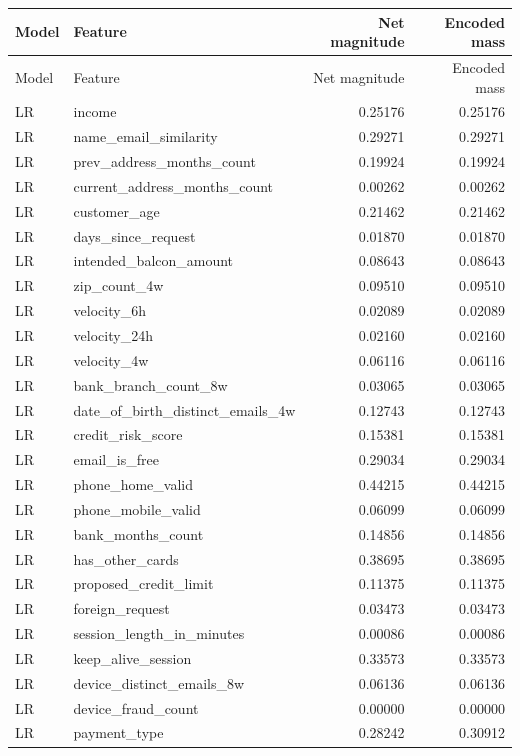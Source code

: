 \begin{longtable}{@{}llrr@{}}
\toprule
Model & Feature & Net magnitude & Encoded mass \\
\midrule
\endfirsthead
\toprule
Model & Feature & Net magnitude & Encoded mass \\
\midrule
\endhead
LR & income & 0.25176 & 0.25176 \\
LR & name\_email\_similarity & 0.29271 & 0.29271 \\
LR & prev\_address\_months\_count & 0.19924 & 0.19924 \\
LR & current\_address\_months\_count & 0.00262 & 0.00262 \\
LR & customer\_age & 0.21462 & 0.21462 \\
LR & days\_since\_request & 0.01870 & 0.01870 \\
LR & intended\_balcon\_amount & 0.08643 & 0.08643 \\
LR & zip\_count\_4w & 0.09510 & 0.09510 \\
LR & velocity\_6h & 0.02089 & 0.02089 \\
LR & velocity\_24h & 0.02160 & 0.02160 \\
LR & velocity\_4w & 0.06116 & 0.06116 \\
LR & bank\_branch\_count\_8w & 0.03065 & 0.03065 \\
LR & date\_of\_birth\_distinct\_emails\_4w & 0.12743 & 0.12743 \\
LR & credit\_risk\_score & 0.15381 & 0.15381 \\
LR & email\_is\_free & 0.29034 & 0.29034 \\
LR & phone\_home\_valid & 0.44215 & 0.44215 \\
LR & phone\_mobile\_valid & 0.06099 & 0.06099 \\
LR & bank\_months\_count & 0.14856 & 0.14856 \\
LR & has\_other\_cards & 0.38695 & 0.38695 \\
LR & proposed\_credit\_limit & 0.11375 & 0.11375 \\
LR & foreign\_request & 0.03473 & 0.03473 \\
LR & session\_length\_in\_minutes & 0.00086 & 0.00086 \\
LR & keep\_alive\_session & 0.33573 & 0.33573 \\
LR & device\_distinct\_emails\_8w & 0.06136 & 0.06136 \\
LR & device\_fraud\_count & 0.00000 & 0.00000 \\
LR & payment\_type & 0.28242 & 0.30912 \\

\end{longtable}
